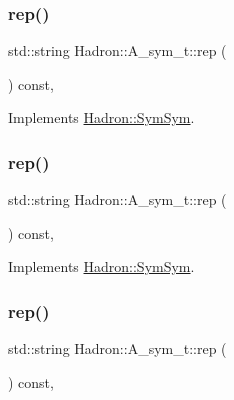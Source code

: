 \subsubsection{\texorpdfstring{rep()}{rep()}\hspace{0.1cm}{\footnotesize\ttfamily [3/5]}}
{\footnotesize\ttfamily std\+::string Hadron\+::\+A\+\_\+sym\+\_\+t\+::rep (\begin{DoxyParamCaption}{ }\end{DoxyParamCaption}) const\hspace{0.3cm}{\ttfamily [inline]}, {\ttfamily [virtual]}}



Implements \mbox{\hyperlink{structHadron_1_1SymSym_aa6e588740862036933a9efe085a5e5e5}{Hadron\+::\+Sym\+Sym}}.

\mbox{\label{structHadron_1_1A__sym__t_ac60fe125eeb713995aafa4712e23f919}} 
\subsubsection{\texorpdfstring{rep()}{rep()}\hspace{0.1cm}{\footnotesize\ttfamily [4/5]}}
{\footnotesize\ttfamily std\+::string Hadron\+::\+A\+\_\+sym\+\_\+t\+::rep (\begin{DoxyParamCaption}{ }\end{DoxyParamCaption}) const\hspace{0.3cm}{\ttfamily [inline]}, {\ttfamily [virtual]}}



Implements \mbox{\hyperlink{structHadron_1_1SymSym_aa6e588740862036933a9efe085a5e5e5}{Hadron\+::\+Sym\+Sym}}.

\mbox{\label{structHadron_1_1A__sym__t_ac60fe125eeb713995aafa4712e23f919}} 
\subsubsection{\texorpdfstring{rep()}{rep()}\hspace{0.1cm}{\footnotesize\ttfamily [5/5]}}
{\footnotesize\ttfamily std\+::string Hadron\+::\+A\+\_\+sym\+\_\+t\+::rep (\begin{DoxyParamCaption}{ }\end{DoxyParamCaption}) const\hspace{0.3cm}{\ttfamily [inline]}, {\ttfamily [virtual]}}



